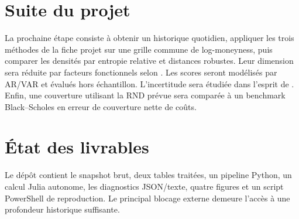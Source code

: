 \documentclass[11pt,a4paper]{article}
\begin{document}
\section{Suite du projet}
La prochaine étape consiste à obtenir un historique quotidien, appliquer les trois
méthodes de la fiche projet sur une grille commune de log-moneyness, puis comparer
les densités par entropie relative et distances robustes. Leur dimension sera réduite
par facteurs fonctionnels selon \textcite{giacomini_et_al_2009}. Les scores seront
modélisés par AR/VAR et évalués hors échantillon. L'incertitude sera étudiée dans
l'esprit de \textcite{taboga_2016}. Enfin, une couverture utilisant la RND prévue
sera comparée à un benchmark Black--Scholes en erreur de couverture nette de coûts.

\section{État des livrables}
Le dépôt contient le snapshot brut, deux tables traitées, un pipeline Python,
un calcul Julia autonome, les diagnostics JSON/texte, quatre figures et un script
PowerShell de reproduction. Le principal blocage externe demeure l'accès à une
profondeur historique suffisante.

\printbibliography[title={Références}]
\end{document}
